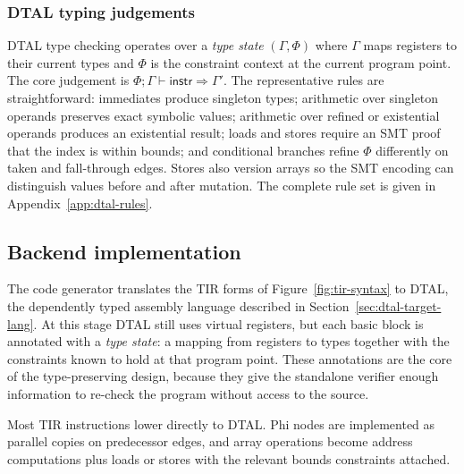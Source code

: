 \subsubsection{DTAL typing judgements}

DTAL type checking operates over a \textit{type state} $(\Gamma, \Phi)$ where $\Gamma$ maps registers to their current types and $\Phi$ is the constraint context at the current program point. The core judgement is $\Phi; \Gamma \vdash \textsf{instr} \Rightarrow \Gamma'$. The representative rules are straightforward: immediates produce singleton types; arithmetic over singleton operands preserves exact symbolic values; arithmetic over refined or existential operands produces an existential result; loads and stores require an SMT proof that the index is within bounds; and conditional branches refine $\Phi$ differently on taken and fall-through edges. Stores also version arrays so the SMT encoding can distinguish values before and after mutation. The complete rule set is given in Appendix~\ref{app:dtal-rules}.

\subsection{Backend implementation}

The code generator translates the TIR forms of Figure~\ref{fig:tir-syntax} to DTAL, the dependently typed assembly language described in Section~\ref{sec:dtal-target-lang}. At this stage DTAL still uses virtual registers, but each basic block is annotated with a \textit{type state}: a mapping from registers to types together with the constraints known to hold at that program point. These annotations are the core of the type-preserving design, because they give the standalone verifier enough information to re-check the program without access to the source.

Most TIR instructions lower directly to DTAL. Phi nodes are implemented as parallel copies on predecessor edges, and array operations become address computations plus loads or stores with the relevant bounds constraints attached.

